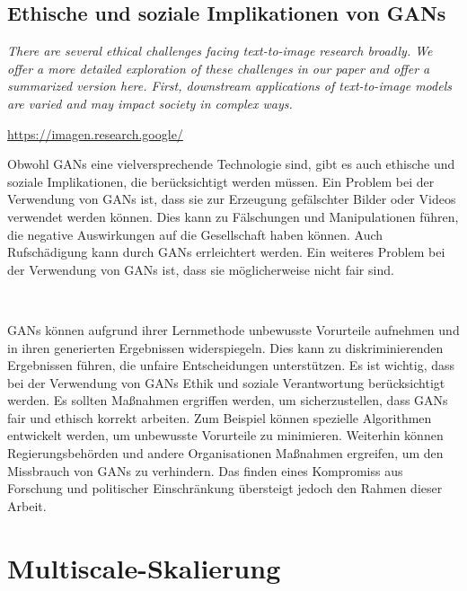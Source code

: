     \subsection{Ethische und soziale Implikationen von GANs}

    \begin{center}
        \textit{There are several ethical challenges facing text-to-image research broadly. We offer a more detailed exploration of these challenges in our paper and offer a summarized version here. First, downstream applications of text-to-image models are varied and may impact society in complex ways.}

        \url{https://imagen.research.google/}
    \end{center}
    
        Obwohl GANs eine vielversprechende Technologie sind, gibt es auch ethische und soziale Implikationen, die berücksichtigt werden müssen.      
        Ein Problem bei der Verwendung von GANs ist, dass sie zur Erzeugung gefälschter Bilder oder Videos verwendet werden können.      
        Dies kann zu Fälschungen und Manipulationen führen, die negative Auswirkungen auf die Gesellschaft haben können.
        Auch Rufschädigung kann durch GANs errleichtert werden.
        Ein weiteres Problem bei der Verwendung von GANs ist, dass sie möglicherweise nicht fair sind.  

        ~

        GANs können aufgrund ihrer Lernmethode unbewusste Vorurteile aufnehmen und in ihren generierten Ergebnissen widerspiegeln.      
        Dies kann zu diskriminierenden Ergebnissen führen, die unfaire Entscheidungen unterstützen.
        Es ist wichtig, dass bei der Verwendung von GANs Ethik und soziale Verantwortung berücksichtigt werden.      
        Es sollten Maßnahmen ergriffen werden, um sicherzustellen, dass GANs fair und ethisch korrekt arbeiten.      
        Zum Beispiel können spezielle Algorithmen entwickelt werden, um unbewusste Vorurteile zu minimieren.      
        Weiterhin können Regierungsbehörden und andere Organisationen Maßnahmen ergreifen, um den Missbrauch von GANs zu verhindern.   
        Das finden eines Kompromiss aus Forschung und politischer Einschränkung übersteigt jedoch den Rahmen dieser Arbeit.      
    
\section{Multiscale-Skalierung}

